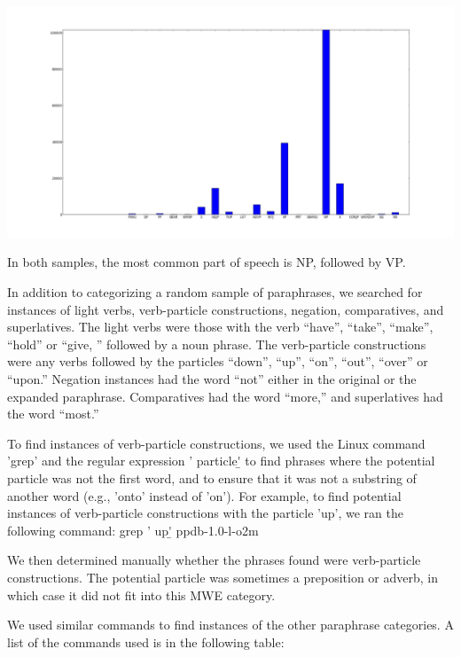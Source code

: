\documentclass[11pt]{article}
\begin{document}
\begin{center}
\includegraphics[width=175mm]{figs/random_sample_pos_histogram_all.pdf}
\end{center}

In both samples, the most common part of speech is NP, followed by VP. 


In addition to categorizing a random sample of paraphrases, we searched for instances of light verbs, verb-particle constructions, negation, comparatives, and superlatives. The light verbs were those with the verb “have”, “take”, “make”, “hold” or “give, ” followed by a noun phrase. The verb-particle constructions were any verbs followed by the particles “down”, “up”, “on”, “out”, “over” or “upon.” Negation instances had the word “not” either in the original or the expanded paraphrase. Comparatives had the word “more,” and superlatives had the word “most.”

To find instances of verb-particle constructions, we used the Linux command 'grep' and the regular expression ' particle\b' to find phrases where the potential particle was not the first word, and to ensure that it was not a substring of another word (e.g., 'onto' instead of 'on'). For example, to find potential instances of verb-particle constructions with the particle 'up', we ran the following command:
grep ' up\b' ppdb-1.0-l-o2m

We then determined manually whether the phrases found were verb-particle constructions. The potential particle was sometimes a preposition or adverb, in which case it did not fit into this MWE category. 

We used similar commands to find instances of the other paraphrase categories. A list of the commands used is in the following table:
\end{document}
